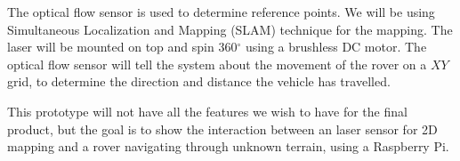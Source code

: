 The optical flow sensor is used to determine reference points. We will be using Simultaneous Localization and Mapping (SLAM) technique for the mapping. The laser will be mounted on top and spin 360$^{\circ}$ using a brushless DC motor. The optical flow sensor will tell the system about the movement of the rover on a $XY$ grid, to determine the direction and distance the vehicle has travelled. 

This prototype will not have all the features we wish to have for the final product, but the goal is to show the interaction between an laser sensor for 2D mapping and a rover navigating through unknown terrain, using a Raspberry Pi.

